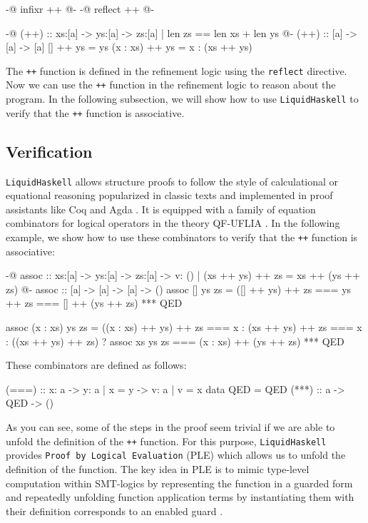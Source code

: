 \documentclass[]{rptuseminar}
\begin{document}
\begin{haskell}
{-@ infixr ++ @-}
{-@ reflect ++ @-}

{-@ (++) :: xs:[a] -> ys:[a] -> { zs:[a] | len zs == len xs + len ys } @-}
(++) :: [a] -> [a] -> [a]
[] ++ ys = ys
(x : xs) ++ ys = x : (xs ++ ys)
\end{haskell}

The \texttt{++} function is defined in the refinement logic using the \texttt{reflect} directive.
Now we can use the \texttt{++} function in the refinement logic to reason about the program.
In the following subsection, we will show how to use \texttt{LiquidHaskell} to verify that  the \texttt{++} function is associative.

\subsection{Verification}
\texttt{LiquidHaskell} allows structure proofs to follow the style of calculational or equational reasoning popularized in classic texts
and implemented in proof assistants like Coq and Agda . It is equipped with a family of equation combinators
for logical operators in the theory QF-UFLIA \cite{vazou_refinement_2018}.
In the following example, we show how to use these combinators to verify that the \texttt{++} function is associative:

\begin{haskell}
{-@ assoc :: xs:[a] -> ys:[a] -> zs:[a] 
  -> { v: () | (xs ++ ys) ++ zs = xs ++ (ys ++ zs) } @-}
assoc :: [a] -> [a] -> [a] -> ()
assoc [] ys zs =
  ([] ++ ys)
    ++ zs
    === ys
    ++ zs
    === []
    ++ (ys ++ zs)
    *** QED

assoc (x : xs) ys zs =
  ((x : xs) ++ ys)
    ++ zs
    ===  x : (xs ++ ys) ++ zs
    === x
    : ((xs ++ ys) ++ zs)
      ? assoc xs ys zs
      === (x : xs)
      ++ (ys ++ zs)
      *** QED
\end{haskell}

These combinators are defined as follows:
\begin{haskell}
  (===) :: x: a -> y: { a | x = y }  -> { v: a | v = x }
  data QED = QED
  (***) :: a -> QED -> ()
\end{haskell}

As you can see, some of the steps in the proof seem trivial if we are able to unfold the definition of the \texttt{++} function.
For this purpose, \texttt{LiquidHaskell} provides \texttt{Proof by Logical Evaluation} (PLE) which allows us to unfold the definition of the function.
The key idea in PLE is to mimic type-level computation within SMT-logics by representing the function in a guarded form and repeatedly unfolding function
application terms by instantiating them with their definition corresponds to an enabled guard \cite{vazou_refinement_2018}.
\end{document}
